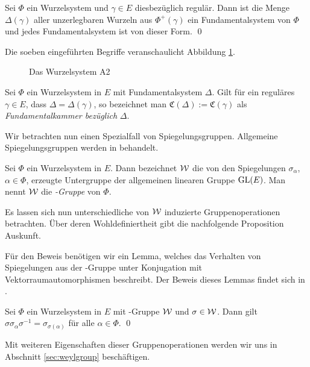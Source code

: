 \begin{thm}
  Sei $\Phi$ ein Wurzelsystem und $\gamma \in E$ diesbezüglich regulär.
  Dann ist die Menge $\Delta(\gamma)$ aller unzerlegbaren Wurzeln aus $\Phi^+(\gamma)$ ein Fundamentalsystem von $\Phi$ und jedes Fundamentalsystem ist von dieser Form. \qed
\end{thm}

Die soeben eingeführten Begriffe veranschaulicht Abbildung \ref{fig:fundamentalWeylChamber}.

\begin{figure}
  \caption{Das Wurzelsystem A2}
  \label{fig:fundamentalWeylChamber}
\end{figure}

\begin{defn}
  Sei $\Phi$ ein Wurzelsystem in $E$ mit Fundamentalsystem $\Delta$.
  Gilt für ein reguläres $\gamma \in E$, dass $\Delta = \Delta(\gamma)$, so bezeichnet man $\mathfrak{C}(\Delta) := \mathfrak{C}(\gamma)$ als \emph{Fundamentalkammer bezüglich} $\Delta$.
\end{defn}

Wir betrachten nun einen Spezialfall von Spiegelungsgruppen. Allgemeine Spiegelungsgruppen werden in \cite{humphreys1992reflection} behandelt.

\begin{defn}
  Sei $\Phi$ ein Wurzelsystem in $E$. 
  Dann bezeichnet $\mathcal{W}$ die von den Spiegelungen $\sigma_\alpha$, $\alpha \in \Phi$, erzeugte Untergruppe der allgemeinen linearen Gruppe $\operatorname{GL}(E)$. 
  Man nennt $\mathcal{W}$ die \emph{\weyl\hyp{}Gruppe} von $\Phi$.
\end{defn}

Es lassen sich nun unterschiedliche von $\mathcal{W}$ induzierte Gruppenoperationen betrachten. Über deren Wohldefiniertheit gibt die nachfolgende Proposition Auskunft. 

Für den Beweis benötigen wir ein Lemma, welches das Verhalten von Spiegelungen aus der \weyl\hyp{}Gruppe unter Konjugation mit Vektorraumautomorphismen beschreibt. 
Der Beweis dieses Lemmas findet sich in \cite[S.43]{humphreys1972introduction}.

\begin{lem}
  \label{lem:conjReflection}
  Sei $\Phi$ ein Wurzelsystem in $E$ mit \weyl\hyp{}Gruppe $\mathcal{W}$ und $\sigma \in \mathcal{W}$.
  Dann gilt $\sigma \sigma_\alpha \sigma^{-1} = \sigma_{\sigma(\alpha)}$ für alle $\alpha \in \Phi$. \qed
\end{lem}

Mit weiteren Eigenschaften dieser Gruppenoperationen werden wir uns in Abschnitt \ref{sec:weylgroup} beschäftigen.

